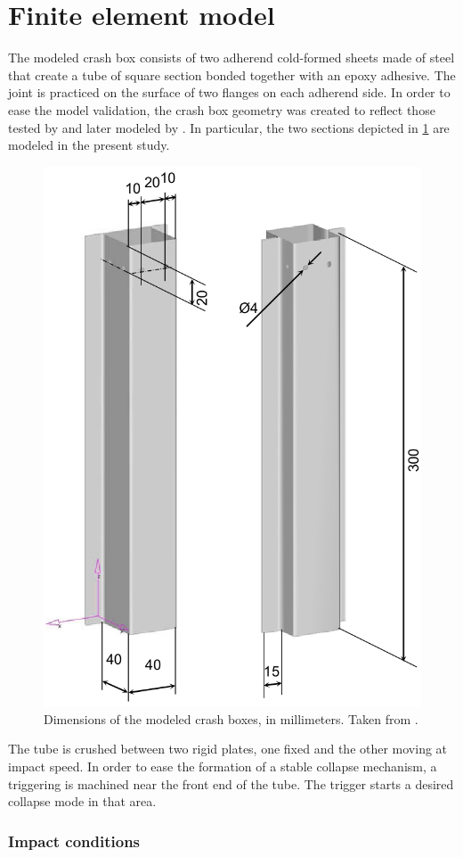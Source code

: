 \documentclass[cmfonts]{witpress}
\begin{document}
\section{Finite element model}
The modeled crash box consists of two adherend cold-formed sheets made of steel that create a tube of square section bonded together with an epoxy adhesive. The joint is practiced on the surface of two flanges on each adherend side. In order to ease the model validation, the crash box geometry was created to reflect those tested by \cite{Peroni2009} and later modeled by \cite{Scattina2011}. In particular, the two sections depicted in \cref{fig:crash_box} are modeled in the present study.

\begin{figure}
	\centering
	\includegraphics[width=0.6\linewidth]{figures/IMG_CUTRES/medidas_cb}
	\caption{Dimensions of the modeled crash boxes, in millimeters. Taken from \cite{Peroni2009}.}
	\label{fig:crash_box}
\end{figure}


The tube is crushed between two rigid plates, one fixed and the other moving at impact speed. In order to ease the formation of a stable collapse mechanism, a triggering is machined near the front end of the tube. The trigger starts a desired collapse mode in that area.

\subsubsection{Impact conditions} %
\label{sec:impact}
\end{document}
